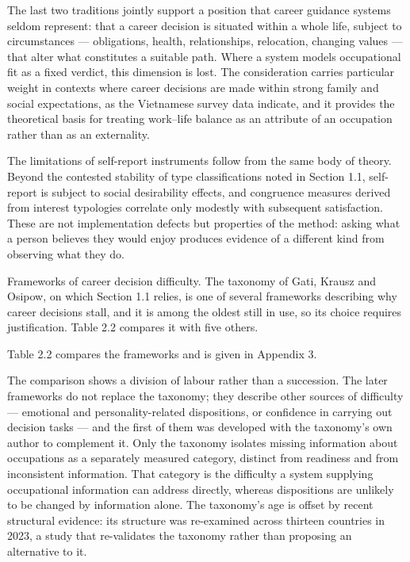 The last two traditions jointly support a position that career guidance systems seldom represent: that a career decision is situated within a whole life, subject to circumstances --- obligations, health, relationships, relocation, changing values --- that alter what constitutes a suitable path. Where a system models occupational fit as a fixed verdict, this dimension is lost. The consideration carries particular weight in contexts where career decisions are made within strong family and social expectations, as the Vietnamese survey data indicate\cite{r4}, and it provides the theoretical basis for treating work--life balance as an attribute of an occupation rather than as an externality.

The limitations of self-report instruments follow from the same body of theory. Beyond the contested stability of type classifications noted in Section 1.1\cite{r6}, self-report is subject to social desirability effects, and congruence measures derived from interest typologies correlate only modestly with subsequent satisfaction. These are not implementation defects but properties of the method: asking what a person believes they would enjoy produces evidence of a different kind from observing what they do.

Frameworks of career decision difficulty. The taxonomy of Gati, Krausz and Osipow\cite{r1}, on which Section 1.1 relies, is one of several frameworks describing why career decisions stall, and it is among the oldest still in use, so its choice requires justification. Table 2.2 compares it with five others.

Table 2.2 compares the frameworks and is given in Appendix 3.

The comparison shows a division of labour rather than a succession. The later frameworks do not replace the taxonomy; they describe other sources of difficulty --- emotional and personality-\allowbreak{}related dispositions\cite{r106,r107,r109}, or confidence in carrying out decision tasks\cite{r108} --- and the first of them was developed with the taxonomy's own author to complement it\cite{r106}. Only the taxonomy isolates missing information about occupations as a separately measured category, distinct from readiness and from inconsistent information. That category is the difficulty a system supplying occupational information can address directly, whereas dispositions are unlikely to be changed by information alone. The taxonomy's age is offset by recent structural evidence: its structure was re-examined across thirteen countries in 2023\cite{r2}, a study that re-\allowbreak{}validates the taxonomy rather than proposing an alternative to it.

